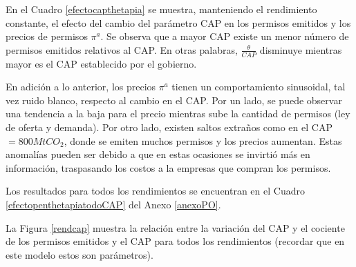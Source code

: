 En el Cuadro \ref{efectocapthetapia} se muestra, manteniendo el rendimiento constante, el efecto del cambio del parámetro CAP en los permisos emitidos y los precios de permisos $\pi^a$.  Se observa que a mayor CAP existe un menor número de permisos emitidos relativos al CAP. En otras palabras, $\frac{\theta}{CAP}$ disminuye mientras mayor es el CAP establecido por el gobierno.
\vspace{2.5mm}

En adición a lo anterior, los precios $\pi^a$ tienen un comportamiento sinusoidal, tal vez ruido blanco, respecto al cambio en el CAP. Por un lado, se puede observar una tendencia a la baja para el precio mientras sube la cantidad de permisos (ley de oferta y demanda). Por otro lado, existen saltos extraños como en el CAP$=800MtCO_2$, donde se emiten muchos permisos y los precios aumentan. Estas anomalías pueden ser debido a que en estas ocasiones se invirtió más en información, traspasando los costos a la empresas que compran los permisos.
\vspace{2.5mm}

Los resultados para todos los rendimientos se encuentran en el Cuadro \ref{efectopenthetapiatodoCAP} del Anexo \ref{anexoPO}.
\vspace{2.5mm}

La Figura \ref{rendcap} muestra la relación entre la variación del CAP y el cociente de los permisos emitidos y el CAP para todos los rendimientos (recordar que en este modelo estos son parámetros).
\vspace{2.5mm}

